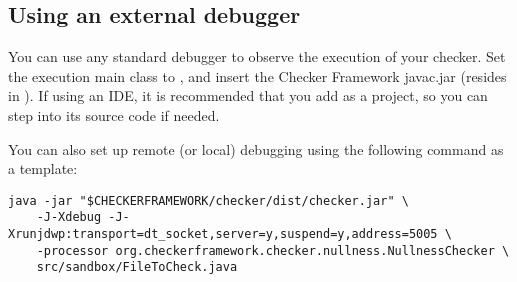 \subsection{Using an external debugger\label{creating-debugging-options-external}}

\begin{sloppypar}
You can use any standard debugger to observe the execution of your checker.
Set the execution main class to , and insert
the Checker Framework javac.jar (resides in
).  If using an IDE, it is
recommended that you add  as a project, so you
can step into its source code if needed.
\end{sloppypar}

You can also set up remote (or local) debugging using the following command as a template:

\begin{Verbatim}
java -jar "$CHECKERFRAMEWORK/checker/dist/checker.jar" \
    -J-Xdebug -J-Xrunjdwp:transport=dt_socket,server=y,suspend=y,address=5005 \
    -processor org.checkerframework.checker.nullness.NullnessChecker \
    src/sandbox/FileToCheck.java

\end{Verbatim}



